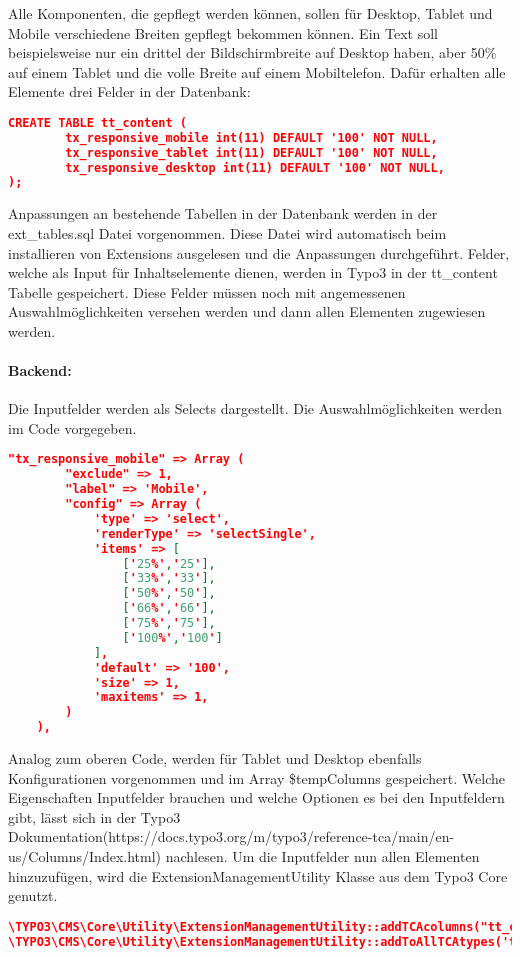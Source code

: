 Alle Komponenten, die gepflegt werden können, sollen für Desktop, Tablet und Mobile verschiedene Breiten gepflegt bekommen können. Ein Text soll beispielsweise nur ein drittel der Bildschirmbreite auf Desktop haben, aber 50\% auf einem Tablet und die volle Breite auf einem Mobiltelefon. Dafür erhalten alle Elemente drei Felder in der Datenbank:
\begin{lstlisting}[language=json,firstnumber=1]
CREATE TABLE tt_content (
        tx_responsive_mobile int(11) DEFAULT '100' NOT NULL,
        tx_responsive_tablet int(11) DEFAULT '100' NOT NULL,
        tx_responsive_desktop int(11) DEFAULT '100' NOT NULL,
);
\end{lstlisting}
Anpassungen an bestehende Tabellen in der Datenbank werden in der ext\_tables.sql Datei vorgenommen. Diese Datei wird automatisch beim installieren von Extensions ausgelesen und die Anpassungen durchgeführt. Felder, welche als Input für Inhaltselemente dienen, werden in Typo3 in der tt\_content Tabelle gespeichert. Diese Felder müssen noch mit angemessenen Auswahlmöglichkeiten versehen werden und dann allen Elementen zugewiesen werden.
\paragraph{Backend:} Die Inputfelder werden als Selects dargestellt. Die Auswahlmöglichkeiten werden im Code vorgegeben.
\begin{lstlisting}[language=json,firstnumber=1]
"tx_responsive_mobile" => Array (
        "exclude" => 1,
        "label" => 'Mobile',
        "config" => Array (
            'type' => 'select',
            'renderType' => 'selectSingle',
            'items' => [
                ['25%','25'],
                ['33%','33'],
                ['50%','50'],
                ['66%','66'],
                ['75%','75'],
                ['100%','100']
            ],
            'default' => '100',
            'size' => 1,
            'maxitems' => 1,
        )
    ),
\end{lstlisting}
Analog zum oberen Code, werden für Tablet und Desktop ebenfalls Konfigurationen vorgenommen und im Array \$tempColumns gespeichert. Welche Eigenschaften Inputfelder brauchen und welche Optionen es bei den Inputfeldern gibt, lässt sich in der Typo3 Dokumentation(https://docs.typo3.org/m/typo3/\newline reference-tca/main/en-us/Columns/Index.html) nachlesen. Um die Inputfelder nun allen Elementen hinzuzufügen, wird die ExtensionManagementUtility Klasse aus dem Typo3 Core genutzt.
\begin{lstlisting}[language=json,firstnumber=1]
\TYPO3\CMS\Core\Utility\ExtensionManagementUtility::addTCAcolumns("tt_content",$tempColumns,1);
\TYPO3\CMS\Core\Utility\ExtensionManagementUtility::addToAllTCAtypes('tt_content','--div--;Responsive,tx_responsive_mobile,tx_responsive_tablet,tx_responsive_desktop','','after:addToAllTCAtypes');
\end{lstlisting}

